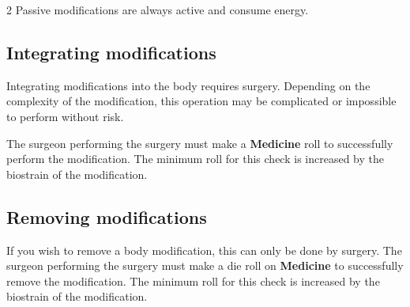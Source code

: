 \begin{multicols}{2}
Passive modifications are always active and consume energy.

\subsection{Integrating modifications}

Integrating modifications into the body requires surgery. Depending on the complexity of the modification, this operation may be complicated or impossible to perform without risk.

The surgeon performing the surgery must make a \textbf{Medicine} roll to successfully perform the modification. The minimum roll for this check is increased by the biostrain of the modification.

\subsection{Removing modifications}

If you wish to remove a body modification, this can only be done by surgery. The surgeon performing the surgery must make a die roll on \textbf{Medicine} to successfully remove the modification. The minimum roll for this check is increased by the biostrain of the modification.
\end{multicols}
